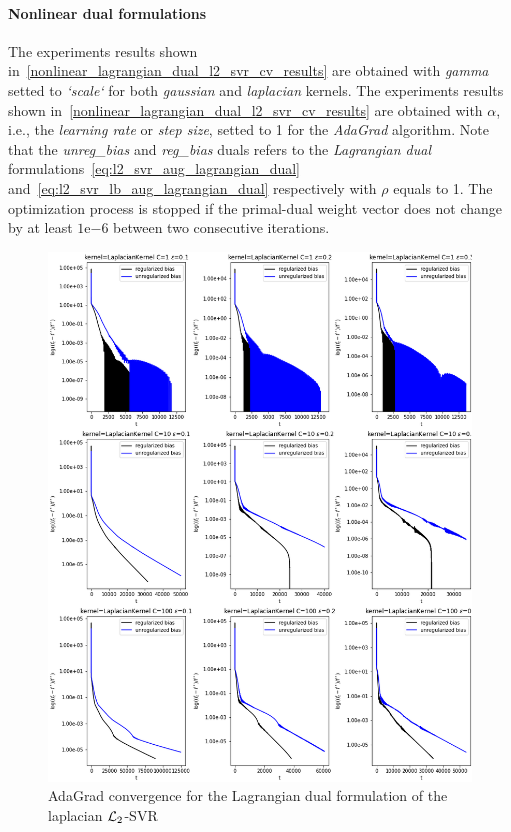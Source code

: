 \paragraph{Nonlinear dual formulations}

The experiments results shown in~\ref{nonlinear_lagrangian_dual_l2_svr_cv_results} are obtained with \emph{gamma} setted to \emph{`scale`} for both \emph{gaussian} and \emph{laplacian} kernels. The experiments results shown in~\ref{nonlinear_lagrangian_dual_l2_svr_cv_results} are obtained with $\alpha$, i.e., the \emph{learning rate} or \emph{step size}, setted to 1 for the \emph{AdaGrad} algorithm. Note that the \emph{unreg\_bias} and \emph{reg\_bias} duals refers to the \emph{Lagrangian dual} formulations~\eqref{eq:l2_svr_aug_lagrangian_dual} and~\eqref{eq:l2_svr_lb_aug_lagrangian_dual} respectively with $\rho$ equals to 1. The optimization process is stopped if the primal-dual weight vector does not change by at least $1\mathrm{e}{-6}$  between two consecutive iterations.



\begin{figure}[H]
	\centering
	\includegraphics[scale=0.55]{img/laplacian_lagrangian_dual_l2_svr_loss_history}
	\caption{AdaGrad convergence for the Lagrangian dual formulation of the laplacian $\protect \mathcal{L}_2$-SVR}
	\label{fig:laplacian_lagrangian_dual_l2_svr_loss_history}
\end{figure}

